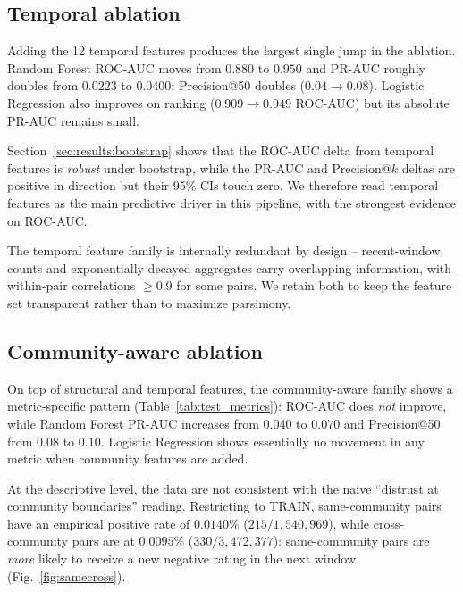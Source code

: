 \documentclass[conference]{IEEEtran}
\begin{document}
\subsection{Temporal ablation}
Adding the 12 temporal features produces the largest single jump in
the ablation. Random Forest ROC-AUC moves from $0.880$ to $0.950$ and
PR-AUC roughly doubles from $0.0223$ to $0.0400$; Precision@50 doubles
($0.04 \to 0.08$). Logistic Regression also improves on ranking
($0.909 \to 0.949$ ROC-AUC) but its absolute PR-AUC remains small.

Section~\ref{sec:results:bootstrap} shows that the ROC-AUC delta from
temporal features is \emph{robust} under bootstrap, while the PR-AUC
and Precision@$k$ deltas are positive in direction but their 95\%
CIs touch zero. We therefore read temporal features as the main
predictive driver in this pipeline, with the strongest evidence on
ROC-AUC.

The temporal feature family is internally redundant by design --
recent-window counts and exponentially decayed aggregates carry
overlapping information, with within-pair correlations $\geq 0.9$ for
some pairs. We retain both to keep the feature set transparent rather
than to maximize parsimony.

\subsection{Community-aware ablation}
On top of structural and temporal features, the community-aware family
shows a metric-specific pattern (Table~\ref{tab:test_metrics}):
ROC-AUC does \emph{not} improve, while Random Forest PR-AUC increases
from $0.040$ to $0.070$ and Precision@50 from $0.08$ to $0.10$.
Logistic Regression shows essentially no movement in any metric when
community features are added.

At the descriptive level, the data are not consistent with the naive
``distrust at community boundaries'' reading. Restricting to TRAIN,
same-community pairs have an empirical positive rate of $0.0140\%$
($215 / 1{,}540{,}969$), while cross-community pairs are at $0.0095\%$
($330 / 3{,}472{,}377$): same-community pairs are \emph{more} likely
to receive a new negative rating in the next window
(Fig.~\ref{fig:samecross}).
\end{document}
